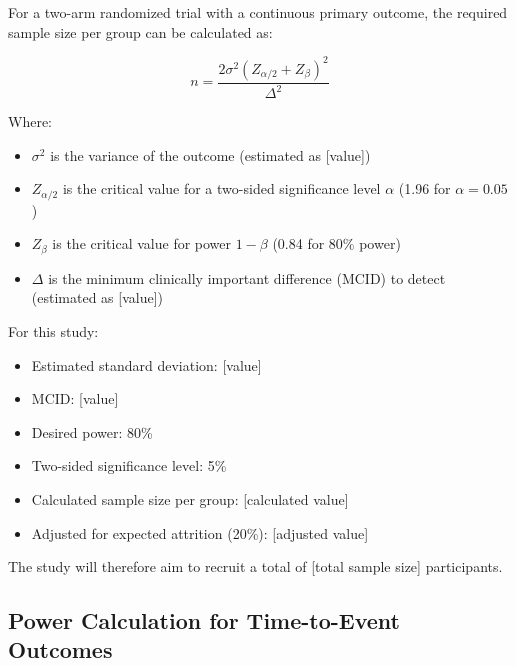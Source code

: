 \begin{tcolorbox}[title=Sample Size Calculation for Continuous Primary Outcome]
For a two-arm randomized trial with a continuous primary outcome, the required sample size per group can be calculated as:

\begin{equation}
n = \frac{2\sigma^2(Z_{\alpha/2} + Z_{\beta})^2}{\Delta^2}
\end{equation}

Where:
\begin{itemize}
    \item $\sigma^2$ is the variance of the outcome (estimated as [value])
    \item $Z_{\alpha/2}$ is the critical value for a two-sided significance level $\alpha$ (1.96 for $\alpha = 0.05$)
    \item $Z_{\beta}$ is the critical value for power $1-\beta$ (0.84 for 80\% power)
    \item $\Delta$ is the minimum clinically important difference (MCID) to detect (estimated as [value])
\end{itemize}

For this study:
\begin{itemize}
    \item Estimated standard deviation: [value]
    \item MCID: [value]
    \item Desired power: 80\%
    \item Two-sided significance level: 5\%
    \item Calculated sample size per group: [calculated value]
    \item Adjusted for expected attrition (20\%): [adjusted value]
\end{itemize}

The study will therefore aim to recruit a total of [total sample size] participants.
\end{tcolorbox}

\subsection{Power Calculation for Time-to-Event Outcomes}

